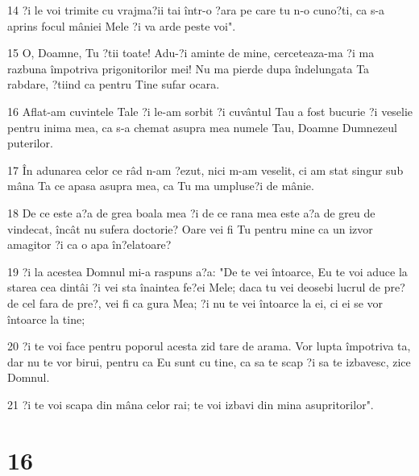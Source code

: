 \par 14 ?i le voi trimite cu vrajma?ii tai într-o ?ara pe care tu n-o cuno?ti, ca s-a aprins focul mâniei Mele ?i va arde peste voi".
\par 15 O, Doamne, Tu ?tii toate! Adu-?i aminte de mine, cerceteaza-ma ?i ma razbuna împotriva prigonitorilor mei! Nu ma pierde dupa îndelungata Ta rabdare, ?tiind ca pentru Tine sufar ocara.
\par 16 Aflat-am cuvintele Tale ?i le-am sorbit ?i cuvântul Tau a fost bucurie ?i veselie pentru inima mea, ca s-a chemat asupra mea numele Tau, Doamne Dumnezeul puterilor.
\par 17 În adunarea celor ce râd n-am ?ezut, nici m-am veselit, ci am stat singur sub mâna Ta ce apasa asupra mea, ca Tu ma umpluse?i de mânie.
\par 18 De ce este a?a de grea boala mea ?i de ce rana mea este a?a de greu de vindecat, încât nu sufera doctorie? Oare vei fi Tu pentru mine ca un izvor amagitor ?i ca o apa în?elatoare?
\par 19 ?i la acestea Domnul mi-a raspuns a?a: "De te vei întoarce, Eu te voi aduce la starea cea dintâi ?i vei sta înaintea fe?ei Mele; daca tu vei deosebi lucrul de pre? de cel fara de pre?, vei fi ca gura Mea; ?i nu te vei întoarce la ei, ci ei se vor întoarce la tine;
\par 20 ?i te voi face pentru poporul acesta zid tare de arama. Vor lupta împotriva ta, dar nu te vor birui, pentru ca Eu sunt cu tine, ca sa te scap ?i sa te izbavesc, zice Domnul.
\par 21 ?i te voi scapa din mâna celor rai; te voi izbavi din mina asupritorilor".

\chapter{16}

